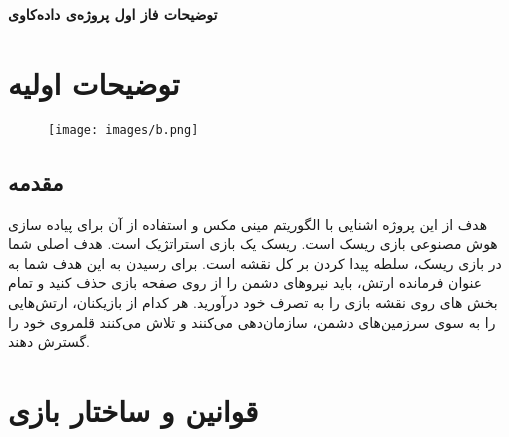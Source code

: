\documentclass{article}
\begin{document}
    \centering
        \huge\textbf{توضیحات فاز اول پروژه‌ی داده‌کاوی}
\begin{large}
    \section{توضیحات اولیه}
    \begin{figure}[h]
        \centering
        \texttt{[image: images/b.png]}
    \end{figure}
\subsection*{مقدمه}
هدف از این پروژه اشنایی با الگوریتم مینی مکس و استفاده از آن برای پیاده سازی هوش مصنوعی بازی ریسک است. ریسک یک بازی استراتژیک است. هدف اصلی شما در بازی ریسک، سلطه پیدا کردن بر کل نقشه است. برای رسیدن به این هدف شما به عنوان فرمانده ارتش، باید نیروهای دشمن را از روی صفحه بازی حذف کنید و تمام بخش های روی نقشه بازی را به تصرف خود درآورید. هر کدام از بازیکنان، ارتش‌هایی را به سوی سرزمین‌های دشمن، سازمان‌دهی می‌کنند و تلاش می‌کنند قلمروی خود را گسترش دهند. 


\section{ قوانین و ساختار بازی}


\end{large}
\end{document}
